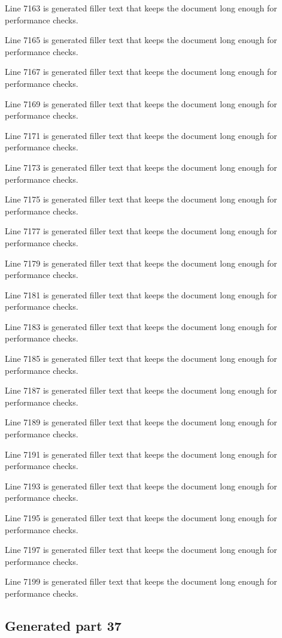 Line 7163 is generated filler text that keeps the document long enough for performance checks.

Line 7165 is generated filler text that keeps the document long enough for performance checks.

Line 7167 is generated filler text that keeps the document long enough for performance checks.

Line 7169 is generated filler text that keeps the document long enough for performance checks.

Line 7171 is generated filler text that keeps the document long enough for performance checks.

Line 7173 is generated filler text that keeps the document long enough for performance checks.

Line 7175 is generated filler text that keeps the document long enough for performance checks.

Line 7177 is generated filler text that keeps the document long enough for performance checks.

Line 7179 is generated filler text that keeps the document long enough for performance checks.

Line 7181 is generated filler text that keeps the document long enough for performance checks.

Line 7183 is generated filler text that keeps the document long enough for performance checks.

Line 7185 is generated filler text that keeps the document long enough for performance checks.

Line 7187 is generated filler text that keeps the document long enough for performance checks.

Line 7189 is generated filler text that keeps the document long enough for performance checks.

Line 7191 is generated filler text that keeps the document long enough for performance checks.

Line 7193 is generated filler text that keeps the document long enough for performance checks.

Line 7195 is generated filler text that keeps the document long enough for performance checks.

Line 7197 is generated filler text that keeps the document long enough for performance checks.

Line 7199 is generated filler text that keeps the document long enough for performance checks.

\subsection{Generated part 37}

